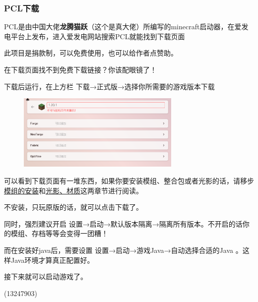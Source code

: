 \documentclass[UTF8,a4paper]{article}
\begin{document}
			\subsubsection{PCL下载}
				\par PCL是由中国大佬\textbf{龙腾猫跃}（这个是真大佬）所编写的minecraft启动器，在爱发电平台上发布，进入爱发电网站搜索PCL就能找到下载页面
				\par 此项目是捐款制，可以免费使用，也可以给作者点赞助。
				\par 在下载页面找不到免费下载链接？你该配眼镜了！
				\par 下载后运行，在上方栏 下载→正式版→选择你所需要的游戏版本下载
				\begin{figure}[H] %
					\centering %
					\includegraphics[width=0.7\textwidth]{./Pictures/PCL_1.png} %
				\end{figure}
				\par 可以看到下载页面有一堆东西，如果你要安装模组、整合包或者光影的话，请移步\hyperlink{modsinstall}{模组的安装}和\hyperlink{guangying}{光影、材质}这两章节进行阅读。
				\par 不安装，只玩原版的话，就可以点击下载了。
				\par 同时，强烈建议开启 设置→启动→默认版本隔离→隔离所有版本。不开启的话你的模组、存档等等会变得一团糟！
				\par 而在安装好java后，需要设置 设置→启动→游戏Java→自动选择合适的Java 。这样Java环境才算真正配置好。
				\par 接下来就可以启动游戏了。
				\begin{flushright}(13247903)\end{flushright}
\end{document}
